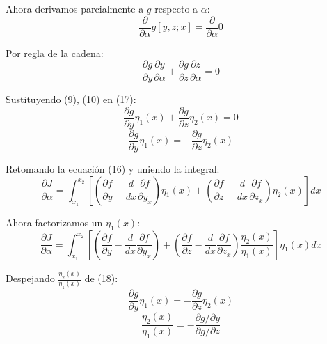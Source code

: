 \vspace*{0.5cm}
Ahora derivamos parcialmente a $g$ respecto a $\alpha$:
\begin{equation*}
    \frac{\partial}{\partial \alpha} g\left[ y,z;x \right] = \frac{\partial}{\partial \alpha} 0
\end{equation*}

Por regla de la cadena:
\begin{equation}
    \frac{\partial g}{\partial y} \frac{\partial y}{\partial \alpha}
    + \frac{\partial g}{\partial z} \frac{\partial z}{\partial \alpha} = 0
\end{equation}

Sustituyendo (9), (10) en (17):
\begin{equation*}
    \frac{\partial g}{\partial y} \eta_{1}(x) + \frac{\partial g}{\partial z} \eta_{2}(x) = 0
\end{equation*}
\begin{equation}
    \frac{\partial g}{\partial y} \eta_{1}(x) = - \frac{\partial g}{\partial z} \eta_{2}(x)
\end{equation}

Retomando la ecuación (16) y uniendo la integral:
\begin{equation*}
    \frac{\partial J}{\partial \alpha} =
    \int_{x_{1}}^{x_{2}} \left[ \left( \frac{\partial f}{\partial y} - \frac{d}{dx} \frac{\partial f}{\partial y_{x}} \right) \eta_{1}(x)
    + \left( \frac{\partial f}{\partial z} - \frac{d}{dx} \frac{\partial f}{\partial z_{x}} \right) \eta_{2}(x) \right] dx
\end{equation*}

Ahora factorizamos un $\eta_{1}(x)$:
\begin{equation}
    \frac{\partial J}{\partial \alpha} =
    \int_{x_{1}}^{x_{2}} \left[ \left( \frac{\partial f}{\partial y} - \frac{d}{dx} \frac{\partial f}{\partial y_{x}} \right)
    + \left( \frac{\partial f}{\partial z} - \frac{d}{dx} \frac{\partial f}{\partial z_{x}} \right) \frac{\eta_{2}(x)}{\eta_{1}(x)} \right] \eta_{1}(x)dx
\end{equation}

Despejando $\frac{\eta_{2}(x)}{\eta_{1}(x)}$ de (18):
\begin{equation*}
    \frac{\partial g}{\partial y} \eta_{1}(x) = - \frac{\partial g}{\partial z} \eta_{2}(x)
\end{equation*}
\begin{equation}
    \frac{\eta_{2}(x)}{\eta_{1}(x)} = - \frac{\partial g/\partial y}{\partial g/\partial z}
\end{equation}

